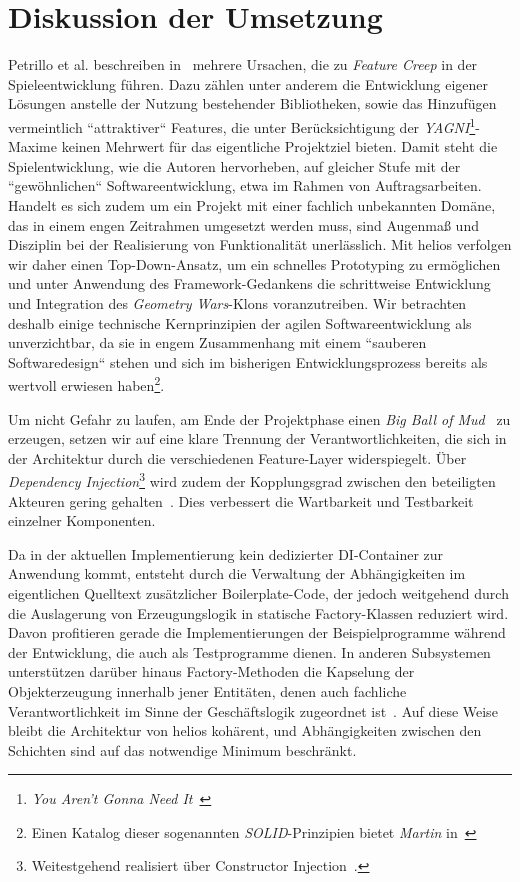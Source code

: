 \section{Diskussion der Umsetzung}

Petrillo et al. beschreiben in~\cite[]{PPTD08} mehrere Ursachen, die zu \textit{Feature Creep} in der Spieleentwicklung führen.
Dazu zählen unter anderem die Entwicklung eigener Lösungen anstelle der Nutzung bestehender Bibliotheken, sowie das Hinzufügen vermeintlich ``attraktiver`` Features, die unter Berücksichtigung der \textit{YAGNI}\footnote{\textit{You Aren't Gonna Need It}~\cite[]{Sch07}}-Maxime keinen Mehrwert für das eigentliche Projektziel bieten.
Damit steht die Spielentwicklung, wie die Autoren hervorheben, auf gleicher Stufe mit der ``gewöhnlichen`` Softwareentwicklung, etwa im Rahmen von Auftragsarbeiten.
Handelt es sich zudem um ein Projekt mit einer fachlich unbekannten Domäne, das in einem engen Zeitrahmen umgesetzt werden muss, sind Augenmaß und Disziplin bei der Realisierung von Funktionalität unerlässlich.
Mit helios verfolgen wir daher einen Top-Down-Ansatz, um ein schnelles Prototyping zu ermöglichen und unter Anwendung des Framework-Gedankens die schrittweise Entwicklung und Integration des \textit{Geometry Wars}-Klons voranzutreiben.
Wir betrachten deshalb einige technische Kernprinzipien der agilen Softwareentwicklung als unverzichtbar, da sie in engem Zusammenhang mit einem ``sauberen Softwaredesign`` stehen und sich im bisherigen Entwicklungsprozess bereits als wertvoll erwiesen haben\footnote{Einen Katalog dieser sogenannten \textit{SOLID}-Prinzipien bietet \textit{Martin} in~\cite[]{Mar03}}.\par

Um nicht Gefahr zu laufen, am Ende der Projektphase einen \textit{Big Ball of Mud}~\cite[]{FY99} zu erzeugen, setzen wir auf eine klare Trennung der Verantwortlichkeiten, die sich in der Architektur durch die verschiedenen Feature-Layer widerspiegelt.
Über \textit{Dependency Injection}\footnote{
    Weitestgehend realisiert über Constructor Injection~\cite[]{FowlerDI}.
} wird zudem der Kopplungsgrad zwischen den beteiligten Akteuren gering gehalten~\cite[]{SZ10}.
Dies verbessert die Wartbarkeit und Testbarkeit einzelner Komponenten.\par
Da in der aktuellen Implementierung kein dedizierter DI-Container zur Anwendung kommt, entsteht durch die Verwaltung der Abhängigkeiten im eigentlichen Quelltext zusätzlicher Boilerplate-Code, der jedoch weitgehend durch die Auslagerung von Erzeugungslogik in statische Factory-Klassen reduziert wird.
Davon profitieren gerade die Implementierungen der Beispielprogramme während der Entwicklung, die auch als Testprogramme dienen.
In anderen Subsystemen unterstützen darüber hinaus Factory-Methoden die Kapselung der Objekterzeugung innerhalb jener Entitäten, denen auch fachliche Verantwortlichkeit im Sinne der Geschäftslogik zugeordnet ist~\cite[139 f.]{Eva03}.
Auf diese Weise bleibt die Architektur von helios kohärent, und Abhängigkeiten zwischen den Schichten sind auf das notwendige Minimum beschränkt.
\par

